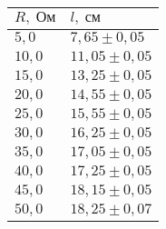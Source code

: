 \begin{tabular}{|l|l|}
\hline
$R,\;\text{Ом}$ & $l,\;\text{см}$\\\hline
$5{,}0$ & $7{,}65 \pm 0{,}05$\\\hline
$10{,}0$ & $11{,}05 \pm 0{,}05$\\\hline
$15{,}0$ & $13{,}25 \pm 0{,}05$\\\hline
$20{,}0$ & $14{,}55 \pm 0{,}05$\\\hline
$25{,}0$ & $15{,}55 \pm 0{,}05$\\\hline
$30{,}0$ & $16{,}25 \pm 0{,}05$\\\hline
$35{,}0$ & $17{,}05 \pm 0{,}05$\\\hline
$40{,}0$ & $17{,}25 \pm 0{,}05$\\\hline
$45{,}0$ & $18{,}15 \pm 0{,}05$\\\hline
$50{,}0$ & $18{,}25 \pm 0{,}07$\\\hline
\end{tabular}
